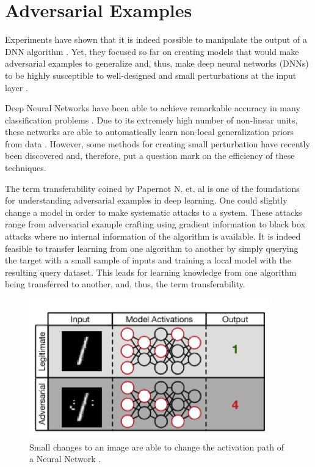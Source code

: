 \documentclass{article}
\begin{document}
\section{Adversarial Examples}\label{sec: adversarial}

Experiments have shown that it is indeed possible to manipulate the output of a DNN algorithm \cite{nguyen2015}. Yet, they focused so far on creating models that would make adversarial examples to generalize and, thus, make deep neural networks (DNNs) to be highly susceptible to well-designed and small perturbations at the input layer \cite{gu2014}\cite{dalvi2004}.

Deep Neural Networks have been able to achieve remarkable accuracy in many classification problems \cite{krizhevsky2012}. Due to its extremely high number of non-linear units, these networks are able to automatically learn non-local generalization priors from data \cite{lowd2005}. However, some methods for creating small perturbation have recently been discovered and, therefore, put a question mark on the efficiency of these techniques.

The term transferability coined by Papernot N. et. al \cite{papernot2016transf} is one of the foundations for understanding adversarial examples in deep learning. One could slightly change a model in order to make systematic attacks to a system. These attacks range from adversarial example crafting using gradient information to black box attacks where no internal information of the algorithm is available. It is indeed feasible to transfer learning from one algorithm to another by simply querying the target with a small sample of inputs and training a local model with the resulting query dataset. This leads for learning knowledge from one algorithm being transferred to another, and, thus, the term transferability.

\begin{figure}[!h]
\centering
	\includegraphics[scale=0.4]{transferability.png}
\caption{Small changes to an image are able to change the activation path of a Neural Network \cite{papernot2016transf}.}
\label{fig:net_change}
\end{figure}
\end{document}

